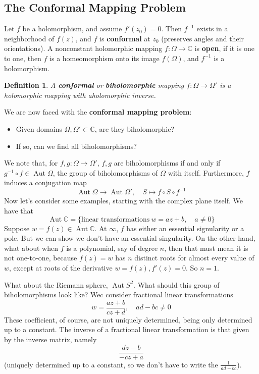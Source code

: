 \documentclass{article}
\newcommand{\mbb}[1]{\mathbb{#1}}
\newtheorem{definition}{Definition}
\DeclareMathOperator{\Aut}{Aut}
\begin{document}
\subsection{The Conformal Mapping Problem}

Let \(f\) be a holomorphism, and assume \(f'(z_0) = 0\). Then \(f^{-1}\) exists in a neighborhood of \(f(z)\), and \(f\) is \textbf{conformal} at \(z_0\) (preserves angles and their orientations). A nonconstant holomorphic mapping \(f: \Omega \to \mbb{C}\) is \textbf{open}, if it is one to one, then \(f\) is a homeomorphism onto its image \(f(\Omega)\), and \(f^{-1}\) is a holomorphism.
\begin{definition}
A \textbf{conformal} or \textbf{biholomorphic} mapping \(f: \Omega \to \Omega'\) is a holomorphic mapping with aholomorphic inverse.
\end{definition}
We are now faced with the \textbf{conformal mapping problem}:
\begin{itemize}

  \item Given domains \(\Omega, \Omega' \subset \mbb{C}\), are they biholomorphic?

  \item If so, can we find all biholomorphisms?

\end{itemize}
We note that, for \(f, g: \Omega \to \Omega'\), \(f, g\) are biholomorphisms if and only if \(g^{-1} \circ f \in \Aut\Omega\), the group of biholomorphisms of \(\Omega\) with itself. Furthermore, \(f\) induces a conjugation map
\[\Aut\Omega \to \Aut\Omega', \quad S \mapsto f \circ S \circ f^{-1}\]
Now let's consider some examples, starting with the complex plane itself. We have that
\[\Aut\mbb{C} = \{\text{linear transformations} \ w = az + b, \quad a \neq 0\}\]
Suppose \(w = f(z) \in \Aut\mbb{C}\). At \(\infty\), \(f\) has either an essential signularity or a pole. But we can show we don't have an essential singularity. On the other hand, what about when \(f\) is a polynomial, say of degree \(n\), then that must mean it is not one-to-one, because
\(f(z) = w\) has \(n\) distinct roots for almost every value of \(w\), except at roots of the derivative \(w = f(z), f'(z) = 0\). So \(n = 1\).

What about the Riemann sphere, \(\Aut S^2\). What should this group of biholomorphisms look like? Wec consider fractional linear transformations
\[w = \frac{az + b}{cz + d}, \quad ad - bc \neq 0\]
These coefficient, of course, are not uniquely determined, being only determined up to a constant. The inverse of a fractional linear transformation is that given by the inverse matrix, namely
\[\frac{dz - b}{-cz + a}\]
(uniquely determined up to a constant, so we don't have to write the \(\frac{1}{ad - bc}\)).
\end{document}

